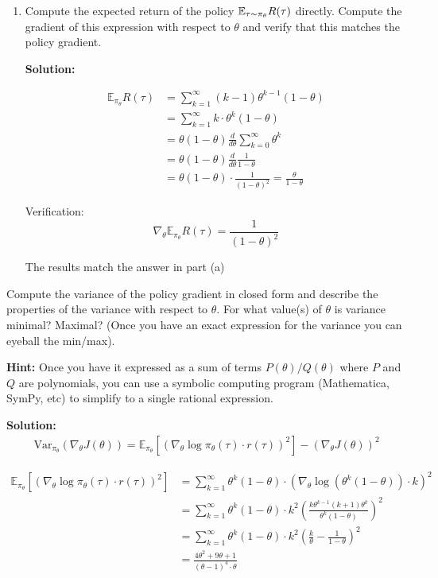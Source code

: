 \documentclass{article}
\begin{document}
\begin{enumerate}
\begin{enumerate}
    \item \label{exact_gradient} Compute the expected return of the policy $\mathbb{E}_{\tau \sim \pi_\theta} R(\tau)$ directly. Compute the gradient of this expression with respect to $\theta$ and verify that this matches the policy gradient.
    
    \textbf{Solution:}
    
    $$
    \begin{aligned}
    \mathbb{E}_{\pi_{\theta}} R(\tau) &= \sum_{k=1}^{\infty} (k-1) \theta^{k-1} (1-\theta) \\
    &= \sum_{k=1}^{\infty} k \cdot \theta^k (1-\theta) \\
    &= \theta (1-\theta) \frac{d}{d\theta} \sum_{k=0}^{\infty} \theta^k \\
    &= \theta (1-\theta) \frac{d}{d\theta} \frac{1}{1-\theta} \\
    &= \theta (1-\theta) \cdot \frac{1}{(1-\theta)^2} = \frac{\theta}{1-\theta}
    \end{aligned}
    $$

    Verification:
    $$
    \nabla_{\theta} \mathbb{E}_{\pi_{\theta}} R(\tau) = \frac{1}{(1-\theta)^2}
    $$

    The results match the answer in part (a)

\end{enumerate}
\newpage
{} Compute the variance of the policy gradient in closed form and describe the properties of the variance with respect to $\theta$. For what value(s) of $\theta$ is variance minimal? Maximal? (Once you have an exact expression for the variance you can eyeball the min/max).

\textbf{Hint:}  Once you have it expressed as a sum of terms $P(\theta)/Q(\theta)$ where $P$ and $Q$ are polynomials, you can use a symbolic computing program (Mathematica, SymPy, etc) to simplify to a single rational expression.

\textbf{Solution:}
    $$
    \begin{aligned}
    \text{Var}_{\pi_{\theta}} \left( \nabla_{\theta} J(\theta) \right) 
    = \mathbb{E}_{\pi_{\theta}} \left[ \left( \nabla_{\theta} \log \pi_{\theta}(\tau) \cdot r(\tau) \right)^2 \right] - \left( \nabla_{\theta} J(\theta) \right)^2 
    \end{aligned}
    $$

    $$
    \begin{aligned}
    \mathbb{E}_{\pi_{\theta}} \left[ \left( \nabla_{\theta} \log \pi_{\theta}(\tau) \cdot r(\tau) \right)^2 \right]
    &= \sum_{k=1}^{\infty} \theta^k (1-\theta) \cdot \left( \nabla_{\theta} \log (\theta^k (1-\theta)) \cdot k \right)^2 \\
    &= \sum_{k=1}^{\infty} \theta^k (1-\theta) \cdot k^2 \left( \frac{k \theta^{k-1} (k+1) \theta^k}{\theta^k (1-\theta)} \right)^2 \\
    &= \sum_{k=1}^{\infty} \theta^k (1-\theta) \cdot k^2 \left( \frac{k}{\theta} - \frac{1}{1-\theta} \right)^2 \\
    &= \frac{4\theta^2 + 9\theta + 1}{(\theta-1)^4 \cdot \theta}
    \end{aligned}
    $$


\end{enumerate}
\end{document}
